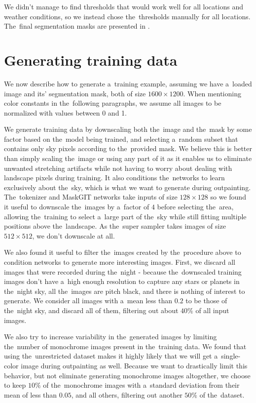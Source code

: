 We didn't manage to find thresholds that would work well for all locations and weather conditions, so we instead chose the~thresholds manually for all locations. The~final segmentation masks are presented in .



\section{Generating training data}

We now describe how to generate a~training example, assuming we have a~loaded image and its' segmentation mask, both of size $1600 \times 1200$. When mentioning color constants in the~following paragraphs, we assume all images to be normalized with values between 0 and 1.

We generate training data by downscaling both the~image and the~mask by some factor based on the~model being trained, and selecting a~random subset that contains only sky pixels according to the~provided mask. We believe this is better than simply scaling the~image or using any part of it as it enables us to eliminate unwanted stretching artifacts while not having to worry about dealing with landscape pixels during training. It also conditions the~networks to learn exclusively about the~sky, which is what we want to generate during outpainting. The~tokenizer and MaskGIT networks take inputs of size $128 \times 128$ so we found it useful to downscale the~images by a~factor of $4$ before selecting the~area, allowing the~training to select a~large part of the~sky while still fitting multiple positions above the~landscape. As the~super sampler takes images of size $512 \times 512$, we don't downscale at all.

We also found it useful to filter the~images created by the~procedure above to condition networks to generate more interesting images. First, we discard all images that were recorded during the~night - because the~downscaled training images don't have a~high enough resolution to capture any stars or planets in the~night sky, all the~images are pitch black, and there is nothing of interest to generate. We consider all images with a~mean less than $0.2$ to be those of the~night sky, and discard all of them, filtering out about $40\%$ of all input images.

We also try to increase variability in the~generated images by limiting the~number of monochrome images present in the~training data. We found that using the~unrestricted dataset makes it highly likely that we will get a~single-color image during outpainting as well. Because we want to drastically limit this behavior, but not eliminate generating monochrome images altogether, we choose to keep $10\%$ of the~monochrome images with a~standard deviation from their mean of less than $0.05$, and all others, filtering out another $50\%$ of the~dataset. 

